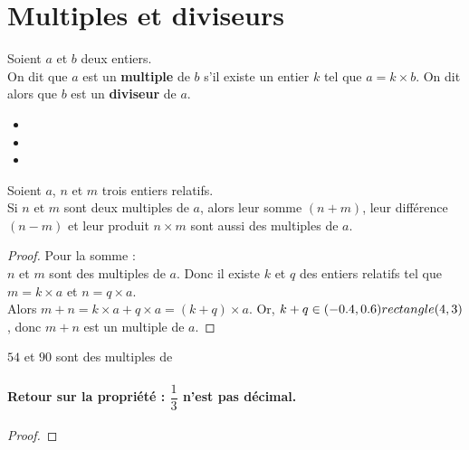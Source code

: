 \section{Multiples et diviseurs}
\begin{Définition}
Soient $a$ et $b$ deux entiers. \\On dit que $a$ est un {\bf{multiple}} de $b$ s'il existe un entier $k$
tel que $a = k\times b$. On dit alors que $b$ est un {\bf{diviseur}} de $a$.
\end{Définition}
\begin{Exemple}
\leavevmode\vspace{-\baselineskip}
\begin{itemize}[label=\textcolor{Couleur8}{$\bullet$}]
\item \ligne

\item \ligne

\item \ligne

\end{itemize}
\end{Exemple}
\begin{Propriété}
Soient $a$, $n$ et $m$ trois entiers relatifs.
\\Si $n$ et $m$ sont deux multiples de $a$, alors leur somme $(n+m)$, leur différence $(n-m)$ et leur
produit $n\times m$ sont aussi des multiples de $a$.
\end{Propriété}

\begin{proof}
Pour la somme : \\$n$ et $m$ sont des multiples de $a$. Donc il existe $k$ et $q$ des entiers relatifs tel que $m=k\times a$ et $n=q\times a$. \\Alors $m+n=k\times a+q\times a=(k+q)\times a$. Or, $k+q\in (-0.4,0.6) rectangle (4,3)$, donc $m+n$ est un multiple de $a$.
\end{proof}

\begin{Exemple}
$54$ et $90$ sont des multiples de \ligne

\end{Exemple}



\paragraph{Retour sur la propriété : $\dfrac{1}{3}$ n'est pas décimal.}

\begin{proof}

\ligne

\ligne

\ligne

\ligne

\ligne

\ligne

\ligne

\ligne


\end{proof}

